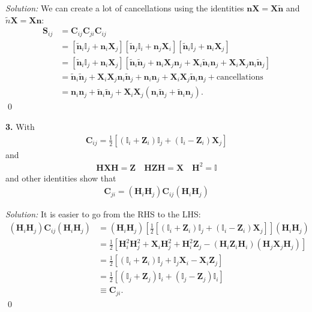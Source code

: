 \documentclass{book}
\theoremstyle{definition}
\newcommand{\nn}{\nonumber}
\newcommand{\n}{\mathbf{n}}
\newcommand{\X}{\mathbf{X}}
\newcommand{\f}[2]{\frac{#1}{#2}}
\newcommand{\lb}{\left[}
\newcommand{\rb}{\right]}
\newcommand{\Id}{\mathbb{I}}
\newcommand{\Z}{\mathbf{Z}}
\newcommand{\had}{\mathbf{H}}
\begin{document}
\noindent \textit{Solution:} We can create a lot of cancellations using the identities $\n\X = \X \tilde{\n}$ and $\tilde{n}\X = \X\n$:
\begin{align}
\mathbf{S}_{ij} &= \mathbf{C}_{ij}\mathbf{C}_{ji}\mathbf{C}_{ij}\nn\\
&= [\tilde{\n}_i\Id_j + \n_i \X_j][\tilde{\n}_j\Id_i + \n_j \X_i][\tilde{\n}_i\Id_j + \n_i \X_j]\nn\\
&= [\tilde{\n}_i\Id_j + \n_i \X_j][\tilde{\n}_i \tilde{\n}_j + \n_i \X_j \n_j +  \X_i \tilde{\n}_i \n_j + \X_i\X_j{\n}_i\tilde{\n}_j]\nn\\
&= \tilde{\n}_i\tilde{\n}_j + \X_i\X_j {\n}_i\tilde{\n}_j + \n_i\n_j +  \X_i\X_j\tilde{\n}_i{\n}_j + \text{cancellations}\nn\\
&= \n_i\n_j + \tilde{\mathbf{\n}}_i \tilde{\mathbf{\n}}_j + \X_i\X_j(\n_i\tilde{\mathbf{n}}_j + \tilde{\mathbf{n}}_i \n_j).
\end{align}
\qed





\newpage


\noindent \textbf{3.} With  
\begin{align}
\mathbf{C}_{ij} = \f{1}{2}\lb (\Id_i + \Z_i)\Id_j + (\Id_i - \Z_i)\X_j \rb
\end{align}
and
\begin{align}
\had \X \had = \Z \quad \had \Z \had = \X \quad \had^2 =\Id
\end{align}
and other identities show that
\begin{align}
\mathbf{C}_{ji} = (\had_i \had_j)\mathbf{C}_{ij}(\had_i\had_j)
\end{align}



\noindent \textit{Solution:} It is easier to go from the RHS to the LHS:
\begin{align}
(\had_i \had_j)\mathbf{C}_{ij}(\had_i\had_j) &= (\had_i \had_j)\lb \f{1}{2}\lb (\Id_i + \Z_i)\Id_j + (\Id_i - \Z_i)\X_j \rb  \rb(\had_i\had_j)\nn\\
&= \f{1}{2}\lb \had_i^2\had_j^2 + \X_i \had_j^2 +  \had_i^2 \Z_j - (\had_i\Z_i\had_i)(\had_j\X_j\had_j) \rb\nn\\
&= \f{1}{2}\lb (\Id_i + \Z_i)\Id_j + \Id_j \X_i - \X_i \Z_j \rb\nn\\
&= \f{1}{2}\lb (\Id_j + \Z_j)\Id_i + (\Id_j - \Z_j)\Id_i  \rb\nn\\
&\equiv \mathbf{C}_{ji}.
\end{align}\qed
\end{document}
